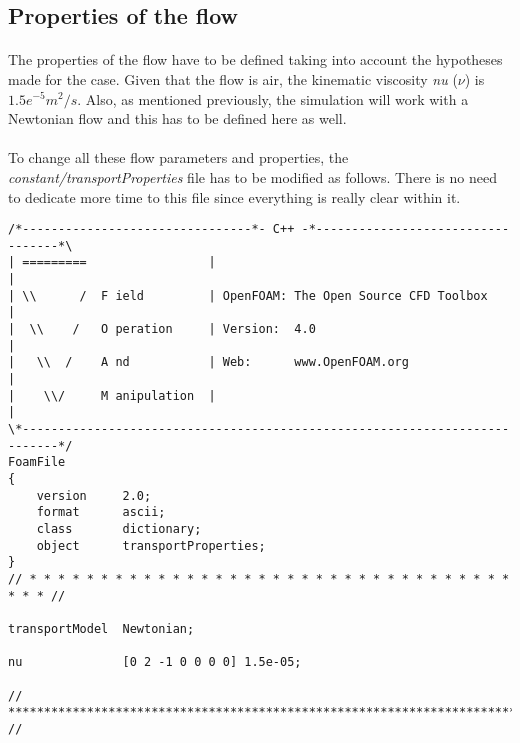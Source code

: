 \subsection{Properties of the flow}
\paragraph{}The properties of the flow have to be defined taking into account the hypotheses made for the case. Given that the flow is air, the kinematic viscosity \textit{nu} ($\nu$) is $1.5e^{-5} m^2/s$. Also, as mentioned previously, the simulation will work with a Newtonian flow and this has to be defined here as well.

\paragraph{}To change all these flow parameters and properties, the \textit{constant/transportProperties} file has to be modified as follows. There is no need to dedicate more time to this file since everything is really clear within it.

\begin{footnotesize}
\begin{verbatim}
/*--------------------------------*- C++ -*----------------------------------*\
| =========                 |                                                 |
| \\      /  F ield         | OpenFOAM: The Open Source CFD Toolbox           |
|  \\    /   O peration     | Version:  4.0                                   |
|   \\  /    A nd           | Web:      www.OpenFOAM.org                      |
|    \\/     M anipulation  |                                                 |
\*---------------------------------------------------------------------------*/
FoamFile
{
    version     2.0;
    format      ascii;
    class       dictionary;
    object      transportProperties;
}
// * * * * * * * * * * * * * * * * * * * * * * * * * * * * * * * * * * * * * //

transportModel  Newtonian;

nu              [0 2 -1 0 0 0 0] 1.5e-05;

// ************************************************************************* //
\end{verbatim}
\end{footnotesize}

